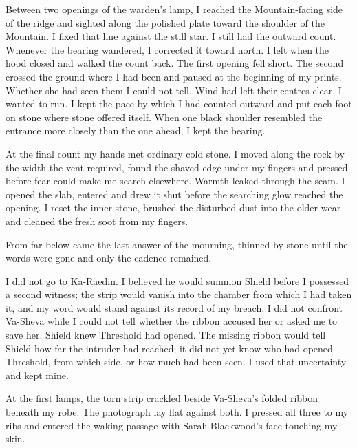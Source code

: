 Between two openings of the warden's lamp, I reached the Mountain-facing side of the ridge and sighted along the polished plate toward the shoulder of the Mountain. I fixed that line against the still star. I still had the outward count. Whenever the bearing wandered, I corrected it toward north. I left when the hood closed and walked the count back. The first opening fell short. The second crossed the ground where I had been and paused at the beginning of my prints. Whether she had seen them I could not tell. Wind had left their centres clear. I wanted to run. I kept the pace by which I had counted outward and put each foot on stone where stone offered itself. When one black shoulder resembled the entrance more closely than the one ahead, I kept the bearing.\par

At the final count my hands met ordinary cold stone. I moved along the rock by the width the vent required, found the shaved edge under my fingers and pressed before fear could make me search elsewhere. Warmth leaked through the seam. I opened the slab, entered and drew it shut before the searching glow reached the opening. I reset the inner stone, brushed the disturbed dust into the older wear and cleaned the fresh soot from my fingers.\par

From far below came the last answer of the mourning, thinned by stone until the words were gone and only the cadence remained.\par

I did not go to Ka-Raedin. I believed he would summon Shield before I possessed a second witness; the strip would vanish into the chamber from which I had taken it, and my word would stand against its record of my breach. I did not confront Va-Sheva while I could not tell whether the ribbon accused her or asked me to save her. Shield knew Threshold had opened. The missing ribbon would tell Shield how far the intruder had reached; it did not yet know who had opened Threshold, from which side, or how much had been seen. I used that uncertainty and kept mine.\par

At the first lamps, the torn strip crackled beside Va-Sheva's folded ribbon beneath my robe. The photograph lay flat against both. I pressed all three to my ribs and entered the waking passage with Sarah Blackwood's face touching my skin.\par

